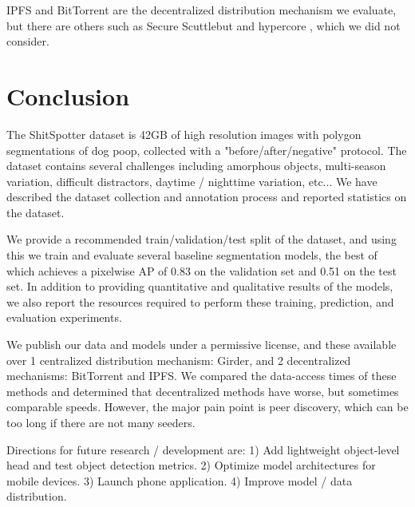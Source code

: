 \documentclass[10pt,twocolumn,letterpaper]{article}
\begin{document}


IPFS and BitTorrent are the decentralized distribution mechanism we evaluate, but there are others such as
  Secure Scuttlebut \cite{tarr_secure_2019} and hypercore \cite{frazee_dep-0002_nodate}, which we did not
  consider.


\section{Conclusion}

The ShitSpotter dataset is 42GB of high resolution images with polygon segmentations of dog poop, collected
  with a "before/after/negative" protocol.
The dataset contains several challenges including amorphous objects, multi-season variation, difficult
  distractors, daytime / nighttime variation, etc...
We have described the dataset collection and annotation process and reported statistics on the dataset.

We provide a recommended train/validation/test split of the dataset, and using this we train and evaluate
  several baseline segmentation models, the best of which achieves a pixelwise AP of 0.83 on the validation
  set and 0.51 on the test set.
In addition to providing quantitative and qualitative results of the models, we also report the resources
  required to perform these training, prediction, and evaluation experiments.

We publish our data and models under a permissive license, and these available over 1 centralized
  distribution mechanism:
Girder, and 2 decentralized mechanisms:
BitTorrent and IPFS.
We compared the data-access times of these methods and determined that
  decentralized methods have worse, but sometimes comparable speeds.
  However, the major pain point is peer discovery, which 
  can be too long if there are not many seeders.

Directions for future research / development are:
1) Add lightweight object-level head and test object detection metrics.
2) Optimize model architectures for mobile devices.
3) Launch phone application.
4) Improve model / data distribution.
\end{document}
